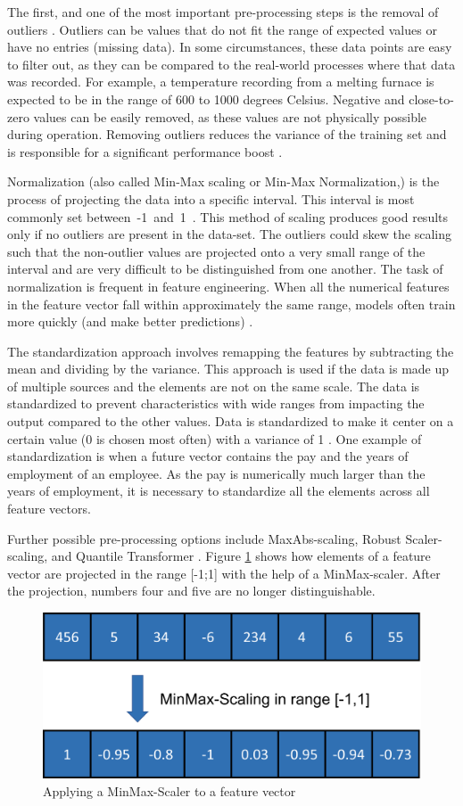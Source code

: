 The first, and one of the most important pre-processing steps is the removal of outliers \cite{Yang}. Outliers can be values that do not fit the range of expected values or have no entries (missing data). In some circumstances, these data points are easy to filter out, as they can be compared to the real-world processes where that data was recorded. For example, a temperature recording from a melting furnace is expected to be in the range of 600 to 1000 degrees Celsius. Negative and close-to-zero values can be easily removed, as these values are not physically possible during operation. Removing outliers reduces the variance of the training set and is responsible for a significant performance boost \cite{Li}.

Normalization (also called Min-Max scaling or Min-Max Normalization,) is the process of projecting the data into a specific interval. This interval is most commonly set between~-1~and~1~\cite{Peshawa}. This method of scaling produces good results only if no outliers are present in the data-set. The outliers could skew the scaling such that the non-outlier values are projected onto a very small range of the interval and are very difficult to be distinguished from one another. The task of normalization is frequent in feature engineering. When all the numerical features in the feature vector fall within approximately the same range, models often train more quickly (and make better predictions) \cite{Jayalakshmi}.

The standardization approach involves remapping the features by subtracting the mean and dividing by the variance. This approach is used if the data is made up of multiple sources and the elements are not on the same scale. The data is standardized to prevent characteristics with wide ranges from impacting the output compared to the other values. Data is standardized to make it center on a certain value (0 is chosen most often) with a variance of 1 \cite{Raju}.
One example of standardization is when a future vector contains the pay and the years of employment of an employee. As the pay is numerically much larger than the years of employment, it is necessary to standardize all the elements across all feature vectors. 

Further possible pre-processing options include MaxAbs-scaling, Robust Scaler-scaling, and Quantile Transformer \cite{Ahsan}.
Figure \ref{fig:MM} shows how elements of a feature vector are projected in the range [-1;1] with the help of a MinMax-scaler. After the projection, numbers four and five are no longer distinguishable. 
\begin{figure}[H]
	\centering
	\includegraphics[width=0.5\linewidth]{IMGs/MM.png}
	\caption{Applying a MinMax-Scaler to a feature vector}
	\label{fig:MM}
\end{figure}


